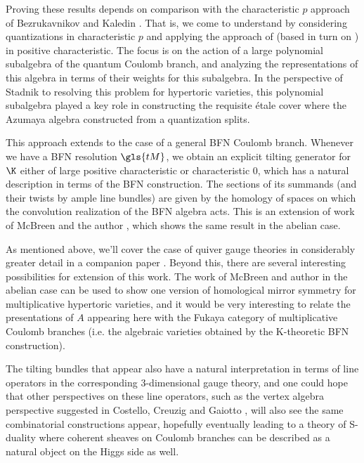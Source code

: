 Proving these results depends on comparison with the characteristic
$p$ approach of Bezrukavnikov and Kaledin \cite{BKpos,KalDEQ}.  That
is, we come to understand by considering quantizations in
characteristic $p$ and applying the approach of \cite{WebSD} (based
in turn on \cite{FOD,MVdB}) in
positive characteristic.  The focus is on the
action of a large polynomial subalgebra of the quantum Coulomb branch,
and analyzing the representations of this algebra in terms of their
weights for this subalgebra.  In the perspective of Stadnik \cite{Stadnik} to resolving this problem
for hypertoric varieties,  this polynomial subalgebra played a key
role in constructing the requisite \'etale cover where the Azumaya
algebra constructed from a quantization splits.  

This approach extends to the case of a general BFN Coulomb branch.
Whenever we have a BFN resolution $\gls{tM}$, we obtain an explicit
tilting generator for $\K$ either of large positive characteristic or
characteristic 0, which has a natural description in terms of the BFN
construction.  The sections of its summands (and their twists by ample
line bundles) are given by the homology of spaces on which the
convolution realization of the BFN algebra acts.  
This is an extension of work of McBreen and the author \cite{McBW}, which
shows the same result in the abelian case.

As mentioned above, we'll cover the case of quiver gauge theories in
considerably greater detail in a companion paper \cite{WebcohII}.
Beyond this, there are several interesting possibilities for extension of this
work.  The work of McBreen and author in the abelian case \cite{McBW} can
be used to show one version of homological mirror symmetry for
multiplicative hypertoric varieties, and it would be very interesting
to relate the presentations of $A$ appearing here with the Fukaya
category of multiplicative Coulomb branches (i.e. the algebraic
varieties obtained by the K-theoretic BFN construction).

The tilting bundles that appear also have a natural interpretation in
terms of line operators in the corresponding 3-dimensional gauge
theory, and one could hope that other perspectives on these line
operators, such as the vertex algebra perspective suggested in
Costello, Creuzig and Gaiotto \cite{CCG}, will also see the same combinatorial
constructions appear, hopefully eventually leading to a theory of
S-duality where coherent sheaves on Coulomb branches can be described
as a natural object on the Higgs side as well.

